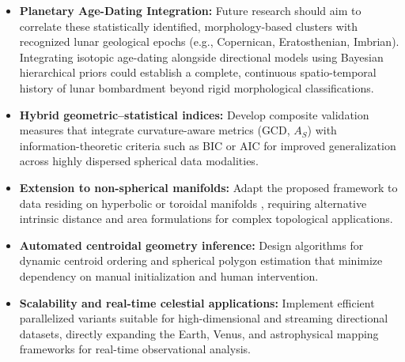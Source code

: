 \documentclass[12pt,a4paper]{report}
\begin{document}
\begin{itemize}
    \item \textbf{Planetary Age-Dating Integration:} Future research should aim to correlate these statistically identified, morphology-based clusters with recognized lunar geological epochs (e.g., Copernican, Eratosthenian, Imbrian). Integrating isotopic age-dating alongside directional models using Bayesian hierarchical priors could establish a complete, continuous spatio-temporal history of lunar bombardment beyond rigid morphological classifications.
    \item \textbf{Hybrid geometric–statistical indices:} Develop composite validation measures that integrate curvature-aware metrics (GCD, $A_S$) with information-theoretic criteria such as BIC or AIC for improved generalization across highly dispersed spherical data modalities.
    \item \textbf{Extension to non-spherical manifolds:} Adapt the proposed framework to data residing on hyperbolic or toroidal manifolds \cite{biswas2025}, requiring alternative intrinsic distance and area formulations for complex topological applications.
    \item \textbf{Automated centroidal geometry inference:} Design algorithms for dynamic centroid ordering and spherical polygon estimation that minimize dependency on manual initialization and human intervention.
    \item \textbf{Scalability and real-time celestial applications:} Implement efficient parallelized variants suitable for high-dimensional and streaming directional datasets, directly expanding the Earth, Venus, and astrophysical mapping frameworks for real-time observational analysis.
\end{itemize}
\end{document}
